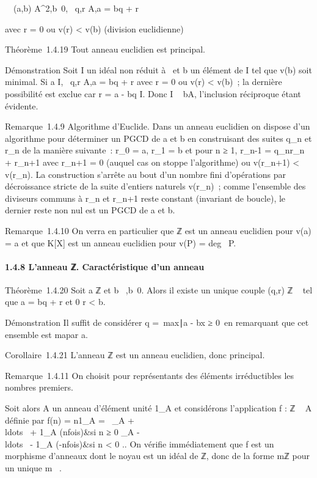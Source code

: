 \documentclass[]{article}
\begin{document}
\forall~~(a,b) \in
A^2,b\neq~0,
\exists~q,r \in A,\quad a = bq + r

avec r = 0 ou v(r) \textless{} v(b) (division euclidienne)

Théorème~1.4.19 Tout anneau euclidien est principal.

Démonstration Soit I un idéal non réduit à
\0\ et b un élément de I tel que v(b)
soit minimal. Si a \in I, \exists~q,r \in
A,\quad a = bq + r avec r = 0 ou v(r) \textless{} v(b)~;
la dernière possibilité est exclue car r = a - bq \in I. Donc I \subset~ bA,
l'inclusion réciproque étant évidente.

Remarque~1.4.9 Algorithme d'Euclide. Dans un anneau euclidien on dispose
d'un algorithme pour déterminer un PGCD de a et b en construisant des
suites q\_n et r\_n de la manière suivante~:
r\_0 = a, r\_1 = b et pour n ≥ 1, r\_n-1 =
q\_nr\_n + r\_n+1 avec r\_n+1 = 0
(auquel cas on stoppe l'algorithme) ou v(r\_n+1) \textless{}
v(r\_n). La construction s'arrête au bout d'un nombre fini
d'opérations par décroissance stricte de la suite d'entiers naturels
v(r\_n)~; comme l'ensemble des diviseurs communs à r\_n
et r\_n+1 reste constant (invariant de boucle), le dernier reste
non nul est un PGCD de a et b.

Remarque~1.4.10 On verra en particulier que ℤ est un anneau euclidien
pour v(a) = \textbar{}a\textbar{} et que K{[}X{]} est un anneau
euclidien pour v(P) = deg~ P.

\paragraph{1.4.8 L'anneau ℤ. Caractéristique d'un anneau}

Théorème~1.4.20 Soit a \in ℤ et b \in {}~,b\neq~0. Alors il existe un unique
couple (q,r) \in ℤ \times {}~ tel que a = bq + r et 0 \leq r \textless{} b.

Démonstration Il suffit de considérer q =\
max\x∣a - bx ≥
0\ en remarquant que cet ensemble est ma par a.

Corollaire~1.4.21 L'anneau ℤ est un anneau euclidien, donc principal.

Remarque~1.4.11 On choisit pour représentants des éléments irréductibles
les nombres premiers.

Soit alors A un anneau d'élément unité 1\_A et considérons
l'application f : ℤ \rightarrow~ A définie par f(n) = n1\_A =
\left \ \_A +
\\ldots~ +
1\_A (n\text fois)&si n ≥ 0
\_A
-\\ldots~ -
1\_A (-n\text fois)&si n \textless{} 0 
\right .. On vérifie immédiatement que f est un morphisme
d'anneaux dont le noyau est un idéal de ℤ, donc de la forme mℤ pour un
unique m \in \mathbb{N}~.
\end{document}
